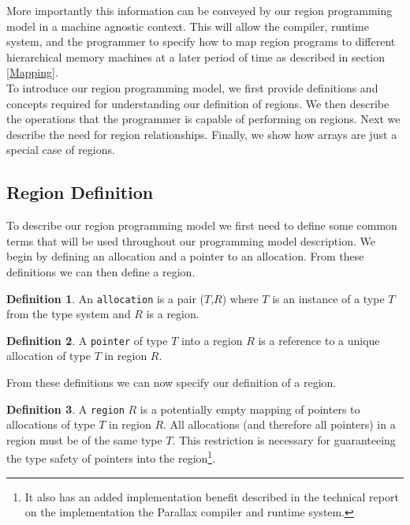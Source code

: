 \documentclass{article}
\theoremstyle{definition}
\newtheorem{definition}{Definition}
\begin{document}
\noindent
More importantly this information can be conveyed by our region programming model in
a machine agnostic context.  This will allow the compiler, runtime system, and the
programmer to specify how to map region programs to different hierarchical memory
machines at a later period of time as described in section \ref{Mapping}. \\

\noindent
To introduce our region programming model, we first provide definitions and concepts
required for understanding our definition of regions.  We then describe the 
operations that the programmer is capable of performing on regions.  Next we
describe the need for region relationships.  Finally, we show how arrays
are just a special case of regions.

\subsection{Region Definition \label{RegionDef}}
\noindent
To describe our region programming model we first need to define some common terms
that will be used throughout our programming model description.  
We begin by defining an allocation and a pointer to an allocation.  
From these definitions we can then define a region.

\begin{definition}
An {\tt allocation} is a pair ($T$,$R$) where $T$ is an instance of a type $T$ from
the type system and $R$ is a region. 
\end{definition}

\begin{definition}
A {\tt pointer} of type $T$ into a region $R$ is a reference to a unique allocation
of type $T$ in region $R$.
\end{definition}

\noindent From these definitions we can now specify our definition of a region.

\begin{definition}
A {\tt region} $R$ is a potentially empty mapping of pointers to allocations of type 
$T$ in region $R$.  All allocations (and therefore all pointers) in a region must be of the
same type $T$.  This restriction is necessary for guaranteeing the type safety of 
pointers into the region\footnote{It also has an added implementation benefit described
in the technical report on the implementation the Parallax compiler and runtime system.}.
\end{definition}
\end{document}
